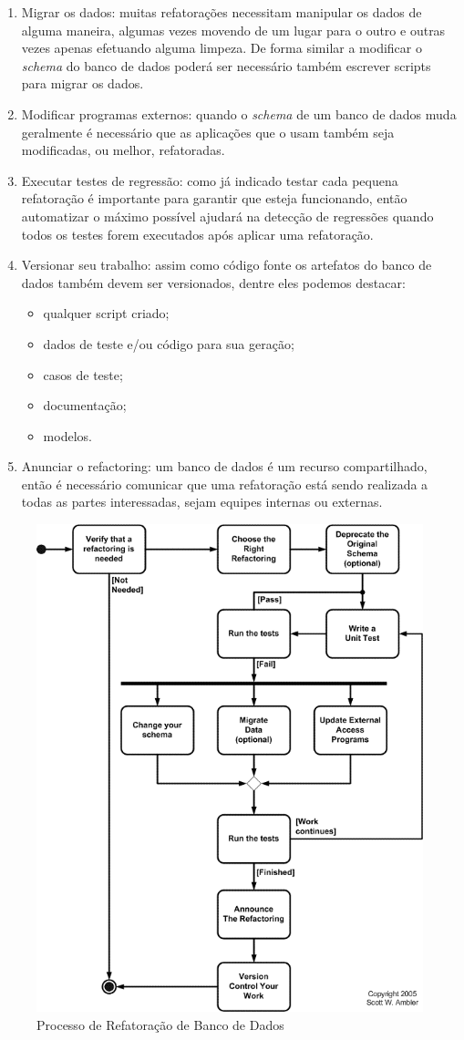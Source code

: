 \documentclass[10pt]{article}
\begin{document}
\begin{enumerate}
		\item Migrar os dados: muitas refatorações necessitam manipular os dados de alguma maneira, algumas vezes movendo de um lugar para o outro e outras vezes apenas efetuando alguma limpeza. De forma similar a modificar o \textit{schema} do banco de dados poderá ser necessário também escrever scripts para migrar os dados.
		\item Modificar programas externos: quando o \textit{schema} de um banco de dados muda geralmente é necessário que as aplicações que o usam também seja modificadas, ou melhor, refatoradas.
		\item Executar testes de regressão: como já indicado testar cada pequena refatoração é importante para garantir que esteja funcionando, então automatizar o máximo possível ajudará na detecção de regressões quando todos os testes forem executados após aplicar uma refatoração.
		\item Versionar seu trabalho: assim como código fonte os artefatos do banco de dados também devem ser versionados, dentre eles podemos destacar:
		    \begin{itemize}
		        \item qualquer script criado;
		        \item dados de teste e/ou código para sua geração;
		        \item casos de teste;
		        \item documentação;
		        \item modelos.
		    \end{itemize}
		\item Anunciar o refactoring: um banco de dados é um recurso compartilhado, então é necessário comunicar que uma refatoração está sendo realizada a todas as partes interessadas, sejam equipes internas ou externas.
	\end{enumerate}

	\begin{figure}[ht]
		\centering
		\includegraphics[width=.5\textwidth]{img/databaseRefactoringProcess.png}
		\caption{Processo de Refatoração de Banco de Dados}
		\label{figura:3}
	\end{figure}
\end{document}
